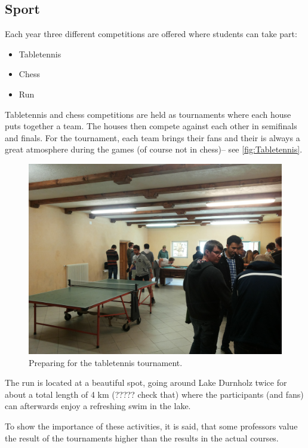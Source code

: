 \subsection{Sport}
Each year three different competitions are offered where students can take part:
\begin{itemize}
\item Tabletennis
\item Chess
\item Run
\end{itemize}
Tabletennis and chess competitions are held as tournaments where each house puts together a team. The houses then compete against each other in semifinals and finals. For the tournament, each team brings their fans and their is always a great atmosphere during the games (of course not in chess)-- see \autoref{fig:Tabletennis}. 
\begin{figure}[ht]%
 	\begin{center}%
 		\includegraphics[scale=0.06]{img/Tabletennis.jpg}%
 		\caption{Preparing for the tabletennis tournament.}\label{fig:Tabletennis}%
 	\end{center}%
\end{figure}

The run is located at a beautiful spot, going around Lake Durnholz twice for about a total length of 4 km (????? check that) where the participants (and fans) can afterwards enjoy a refreshing swim in the lake. 

To show the importance of these activities, it is said, that some professors value the result of the tournaments higher than the results in the actual courses.

